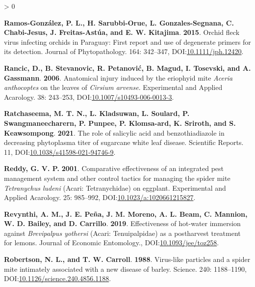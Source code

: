 \documentclass{ufdissertation}[overrideChapters] %
\newlength{\cslhangindent}
\newenvironment{CSLReferences}[2] %
 {%
  \setlength{\parindent}{0pt}
  \ifodd #1 \everypar{\setlength{\hangindent}{\cslhangindent}}\ignorespaces\fi
  \ifnum #2 > 0
  \setlength{\parskip}{#2\baselineskip}
  \fi
 }%
 {}
\begin{document}
{\begin{CSLReferences}{1}{1}
\leavevmode{}%
\textbf{Ramos-González, P. L., H. Sarubbi-Orue, L. Gonzales-Segnana, C. Chabi-Jesus, J. Freitas-Astúa, and E. W. Kitajima}. \textbf{2015}. {Orchid fleck virus} infecting orchids in {Paraguay}: First report and use of degenerate primers for its detection. Journal of Phytopathology. 164: 342--347, DOI:\href{https://doi.org/10.1111/jph.12420}{10.1111/jph.12420}.

\leavevmode{}%
\textbf{Rancic, D., B. Stevanovic, R. Petanović, B. Magud, I. Tosevski, and A. Gassmann}. \textbf{2006}. Anatomical injury induced by the eriophyid mite {\emph{Aceria anthocoptes}} on the leaves of {\emph{Cirsium arvense}}. Experimental and Applied Acarology. 38: 243--253, DOI:\href{https://doi.org/10.1007/s10493-006-0013-3}{10.1007/s10493-006-0013-3}.

\leavevmode{}%
\textbf{Ratchaseema, M. T. N., L. Kladsuwan, L. Soulard, P. Swangmaneecharern, P. Punpee, P. Klomsa-ard, K. Sriroth, and S. Keawsompong}. \textbf{2021}. The role of salicylic acid and benzothiadiazole in decreasing phytoplasma titer of sugarcane white leaf disease. Scientific Reports. 11, DOI:\href{https://doi.org/10.1038/s41598-021-94746-9}{10.1038/s41598-021-94746-9}.

\leavevmode{}%
\textbf{Reddy, G. V. P.} \textbf{2001}. Comparative effectiveness of an integrated pest management system and other control tactics for managing the spider mite {\emph{Tetranychus ludeni}} {(Acari: Tetranychidae)} on eggplant. Experimental and Applied Acarology. 25: 985--992, DOI:\href{https://doi.org/10.1023/a:1020661215827}{10.1023/a:1020661215827}.

\leavevmode{}%
\textbf{Revynthi, A. M., J. E. Peña, J. M. Moreno, A. L. Beam, C. Mannion, W. D. Bailey, and D. Carrillo}. \textbf{2019}. Effectiveness of hot-water immersion against {\emph{Brevipalpus yothersi}} ({Acari}: {Tenuipalpidae}) as a postharvest treatment for lemons. Journal of Economic Entomology., DOI:\href{https://doi.org/10.1093/jee/toz258}{10.1093/jee/toz258}.

\leavevmode{}%
\textbf{Robertson, N. L., and T. W. Carroll}. \textbf{1988}. Virus-like particles and a spider mite intimately associated with a new disease of barley. Science. 240: 1188--1190, DOI:\href{https://doi.org/10.1126/science.240.4856.1188}{10.1126/science.240.4856.1188}.


\end{CSLReferences}}
\end{document}
